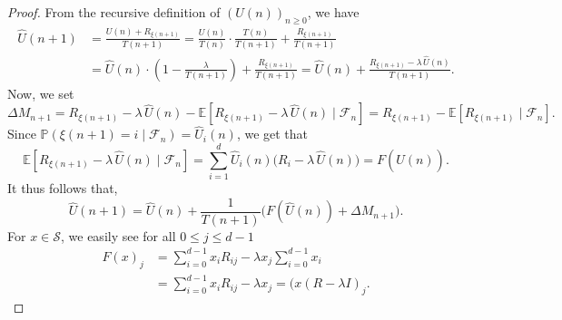 \documentclass[10pt,a4paper]{amsart}
\begin{document}
\begin{proof}
From the recursive definition of $(U(n))_{n \geq 0}$, we have
\begin{align*}
    \hat{U}(n+1)
    &= \frac{U(n) +R_{\xi(n+1)}}{T(n+1)}
     = \frac{U(n)}{T(n)} \cdot \frac{T(n)}{T(n+1)} + \frac{R_{\xi(n+1)}}{T(n+1)} \\[6pt]
    &= \hat{U}(n) \cdot \left(1 - \frac{\lambda}{T(n+1)}\right)
       + \frac{R_{\xi(n+1)}}{T(n+1)}
       =\hat{U}(n)+ \frac{R_{\xi(n+1)} - \lambda\,\hat{U}(n)}{T(n+1)}.
\end{align*}
Now, we set
\[
    \Delta M_{n+1}
    = R_{\xi(n+1)} - \lambda\,\hat{U}(n)
      - \mathbb{E}\!\left[R_{\xi(n+1)} - \lambda\,\hat{U}(n)\mid \mathcal{F}_n\right]=R_{\xi(n+1)} 
      - \mathbb{E}\!\left[R_{\xi(n+1)} \mid \mathcal{F}_n\right].
\]
Since $\mathbb{P}(\xi(n+1) = i \mid \mathcal{F}_n) = \hat{U}_i(n)$, we get that
\[
    \mathbb{E}\!\left[R_{\xi(n+1)} - \lambda\,\hat{U}(n)
    \mid \mathcal{F}_n\right]
    = \sum_{i=1}^{d} \hat{U}_i(n)\bigl(R_i - \lambda\,\hat{U}(n)\bigr)=F(\hat{U}(n)).
\]
It thus follows that,
\[
    \hat{U}(n+1) = \hat{U}(n) + \frac{1}{T(n+1)}\bigl(F(\hat{U}(n)) + \Delta M_{n+1}\bigr).
\]
For $x \in \mathcal{S}$, we easily see for all $0\leq j\leq d-1$
\begin{align*}
    F(x)_j&= \sum_{i=0}^{d-1}x_iR_{ij}-\lambda x_j\sum_{i=0}^{d-1}x_i\\
    &=\sum_{i=0}^{d-1}x_iR_{ij}-\lambda x_j=(x(R-\lambda I)_j.
\end{align*}
\end{proof}
\end{document}
